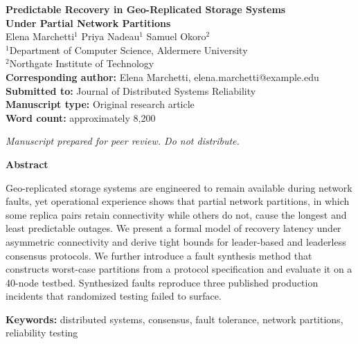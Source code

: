 \documentclass[12pt]{article}
\begin{document}
\begin{titlepage}
\begin{center}
\vspace*{1.2in}
{\Large\bfseries Predictable Recovery in Geo-Replicated Storage Systems\\[0.4em]
Under Partial Network Partitions}\\[0.8in]

{\large Elena Marchetti$^{1}$ \quad Priya Nadeau$^{1}$ \quad Samuel Okoro$^{2}$}\\[0.5in]

$^{1}$Department of Computer Science, Aldermere University\\
$^{2}$Northgate Institute of Technology\\[0.6in]

\textbf{Corresponding author:} Elena Marchetti, elena.marchetti@example.edu\\[0.4in]

\textbf{Submitted to:} Journal of Distributed Systems Reliability\\
\textbf{Manuscript type:} Original research article\\
\textbf{Word count:} approximately 8{,}200
\end{center}
\vfill
\begin{center}
\textit{Manuscript prepared for peer review. Do not distribute.}
\end{center}
\end{titlepage}

\begin{center}
{\large\bfseries Abstract}
\end{center}
\noindent Geo-replicated storage systems are engineered to remain available
during network faults, yet operational experience shows that partial network
partitions, in which some replica pairs retain connectivity while others do
not, cause the longest and least predictable outages. We present a formal model
of recovery latency under asymmetric connectivity and derive tight bounds for
leader-based and leaderless consensus protocols. We further introduce a fault
synthesis method that constructs worst-case partitions from a protocol
specification and evaluate it on a 40-node testbed. Synthesized faults reproduce
three published production incidents that randomized testing failed to surface.

\bigskip
\noindent\textbf{Keywords:} distributed systems, consensus, fault tolerance,
network partitions, reliability testing
\end{document}
